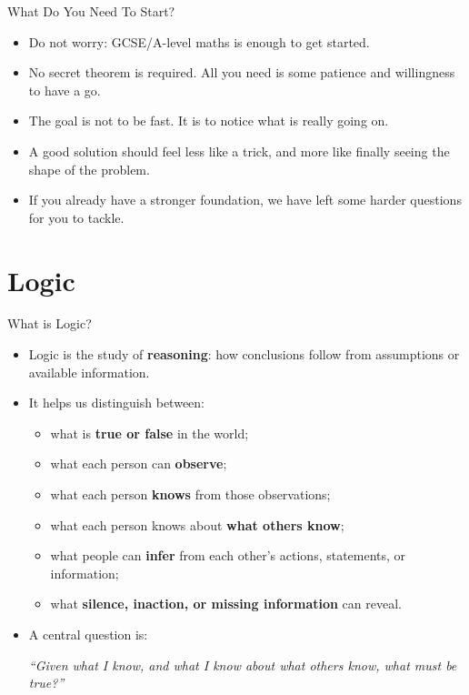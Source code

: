 \documentclass{beamer}
\begin{document}
\begin{frame}{What Do You Need To Start?}
    \pause
    \begin{itemize}
        \item Do not worry: GCSE/A-level maths is enough to get started.
        \item No secret theorem is required. All you need is some
            patience and willingness to have a go.
        \item The goal is not to be fast. It is to notice what is
            really going on.
        \item A good solution should feel less like a trick, and more
            like finally seeing the shape of the problem.
        \item If you already have a stronger foundation, we have left
            some harder questions for you to tackle.
    \end{itemize}
\end{frame}

\section{Logic}

\begin{frame}{What is Logic?}
    \pause
    \begin{itemize}
        \item Logic is the study of \textbf{reasoning}:
            how conclusions follow from assumptions or available information.
        \item It helps us distinguish between:
            \begin{itemize}
                \item what is \textbf{true or false} in the world;
                \item what each person can \textbf{observe};
                \item what each person \textbf{knows} from those observations;
                \item what each person knows about \textbf{what others know};
                \item what people can \textbf{infer} from each other's actions,
                    statements, or information;
                \item what \textbf{silence, inaction, or missing information}
                    can reveal.
            \end{itemize}
        \item A central question is:
            \begin{center}
                \emph{``Given what I know, and what I know about what
                    others know,
                what must be true?''}
            \end{center}
    \end{itemize}
\end{frame}
\end{document}
